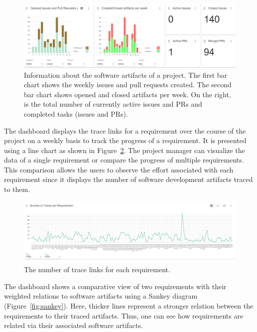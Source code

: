 \begin{figure}[hbt]
    \centering
    \includegraphics[width=.9\linewidth]{figs/dashboard-barcharts.png}
    \caption{Information about the software artifacts of a project. The first bar chart shows the weekly issues and pull requests created. The second bar chart shows opened and closed artifacts per week.  On the right, is the total number of currently active issues and PRs and completed tasks (issues and PRs). }
    \label{fig:barcharts}
\end{figure}

The dashboard displays the trace links for a requirement over the course of the project on a weekly basis to track the progress of a requirement.
It is presented using a line chart as shown in Figure~\ref{fig:linechart}. 
The project manager can visualize the data of a single requirement or compare the progress of multiple requirements. 
This comparison allows the users to observe the effort associated with each requirement
since it displays the number of software development artifacts traced to them.

\begin{figure}[htb]
    \centering
    \includegraphics[width=.9\linewidth]{figs/linechart.png}
    \caption{The number of trace links for each requirement. }
    \label{fig:linechart}
\end{figure}

The dashboard shows a comparative  view of two requirements with their weighted relations to software artifacts using  a Sankey diagram (Figure~\ref{fig:sankey}).
Here, thicker lines represent a stronger relation between the requirements to their traced artifacts. 
Thus, one can see how requirements are related via their associated software artifacts.

